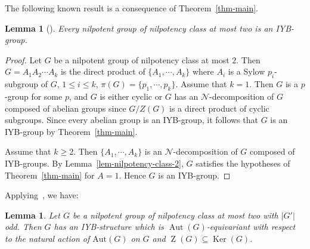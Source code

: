 \documentclass[12pt,a4paper]{article}
\DeclareMathOperator{\Z}{Z}
\DeclareMathOperator{\Fit}{F}
\DeclareMathOperator{\Ker}{Ker}
\DeclareMathOperator{\Aut}{Aut}
\DeclareMathOperator{\Q}{Q}
\newtheorem{lemma}[theorem]{Lemma}
\theoremstyle{definition}
\begin{document}


The following known result is a consequence of Theorem~\ref{thm-main}.

\begin{lemma}[{\cite[Lemma~16]{CedoJespersRio2010}}]\label{nilp}
Every nilpotent group of nilpotency class at most two is an IYB-group.
\end{lemma}

\begin{proof}
Let $G$ be a nilpotent group of nilpotency class at most $2$. Then $G = A_1A_2\cdots A_k$ is the direct product of $\{ A_1, \cdots,A_k\}$  where $A_i$ is a Sylow $p_i$-subgroup of $G$, $1\leq i \leq k$, $\pi(G) = \{p_1,\cdots, p_k\}$. Assume that $k = 1$. Then $G$ is a $p$-group for some $p$, and $G$ is either cyclic or $G$ has an $\mathcal{N}$-decomposition of $G$  composed of abelian groups since $G/Z(G)$ is a direct product of cyclic subgroups. Since every abelian group is an IYB-group, it follows that $G$ is an IYB-group by Theorem~\ref{thm-main}.

Assume that $k \geq 2$. Then $\{ A_1, \cdots,A_k\}$ is an $\mathcal{N}$-decomposition of $G$ composed of IYB-groups. By Lemma~\ref{lem-nilpotency-class-2}, $G$ satisfies the hypotheses of Theorem~\ref{thm-main} for $A = 1$. Hence $G$ is an IYB-group.

\end{proof}

Applying~\cite[Corollary~4.2]{MengBallesterEstebanFuster2021}, we have:

\begin{lemma}\label{lem-odd-order-commutator}
Let $G$ be a nilpotent group of nilpotency class at most two with $|G'|$ odd. Then $G$ has an IYB-structure which is \(\Aut(G)\)-equivariant with respect to the natural action of \(\text{Aut}(G)\) on \( G \) and $\Z(G) \subseteq \Ker(G)$.
\end{lemma}
\end{document}
